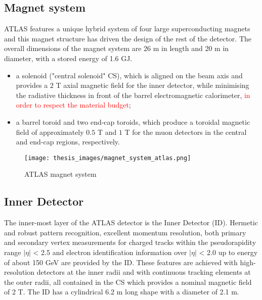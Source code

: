 \documentclass[a4paper, oneside, 11pt, openright]{book}
\begin{document}
			\subsection{Magnet system}
				ATLAS features a unique hybrid system of four large superconducting magnets and this magnet structure has driven the design of the rest of the detector. The overall dimensions of the magnet system are 26 m in length and 20 m in diameter, with a stored energy of 1.6 GJ.
				\begin{itemize}
					\item a solenoid ("central solenoid" CS), which is aligned on the beam axis and provides a $2$ T axial magnetic field for the inner detector,  while minimising the radiative thickness in front of the barrel electromagnetic calorimeter, \textcolor{red}{in order to respect the material budget};
					\item a  barrel  toroid and  two  end-cap  toroids, which  produce  a toroidal magnetic field of approximately $0.5$ T and $1$ T for the muon detectors in the central and end-cap regions, respectively.
				\end{itemize}
			
				\begin{figure}[H]
					\centering
					\texttt{[image: thesis\_images/magnet\_system\_atlas.png]}
					\caption{ATLAS magnet system}
				\end{figure}
			
			\subsection{Inner Detector}
				The inner-most layer of the ATLAS detector is the Inner Detector (ID). Hermetic and robust pattern recognition, excellent momentum resolution, both primary and secondary vertex measurements for charged tracks within the pseudorapidity range $|\eta|$ < 2.5 and electron identification information over $|\eta|$ < 2.0 up to energy of about 150 GeV are provided by the ID. These features are achieved with high-resolution detectors at the inner radii and  with continuous tracking elements at the outer radii, all contained in the CS which provides a nominal magnetic field of 2 T. The ID has a cylindrical 6.2 m long shape with a diameter of 2.1 m.
				
\end{document}
